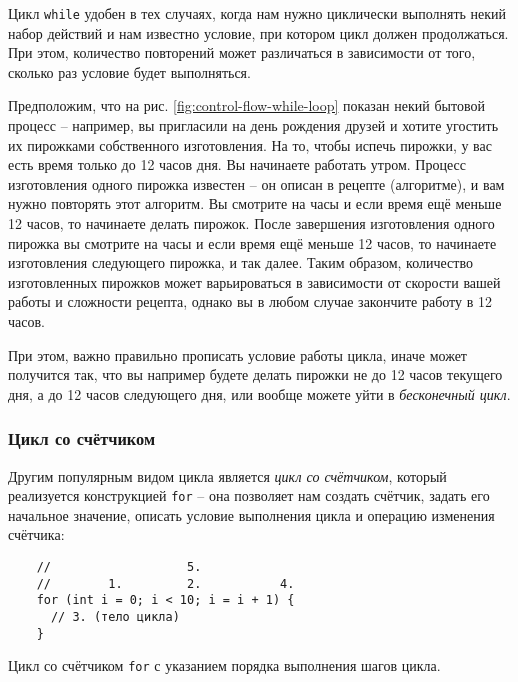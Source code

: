 \documentclass[../sparc.tex]{subfiles}
\begin{document}
Цикл \texttt{while} удобен в тех случаях, когда нам нужно циклически выполнять
некий набор действий и нам известно условие, при котором цикл должен
продолжаться.  При этом, количество повторений может различаться в зависимости
от того, сколько раз условие будет выполняться.

Предположим, что на рис. \ref{fig:control-flow-while-loop} показан некий бытовой
процесс -- например, вы пригласили на день рождения друзей и хотите угостить их
пирожками собственного изготовления.  На то, чтобы испечь пирожки, у вас есть
время только до 12 часов дня.  Вы начинаете работать утром.  Процесс
изготовления одного пирожка известен -- он описан в рецепте (алгоритме), и вам
нужно повторять этот алгоритм.  Вы смотрите на часы и если время ещё меньше 12
часов, то начинаете делать пирожок.  После завершения изготовления одного
пирожка вы смотрите на часы и если время ещё меньше 12 часов, то начинаете
изготовления следующего пирожка, и так далее.  Таким образом, количество
изготовленных пирожков может варьироваться в зависимости от скорости вашей
работы и сложности рецепта, однако вы в любом случае закончите работу в 12
часов.

При этом, важно правильно прописать условие работы цикла, иначе может получится
так, что вы например будете делать пирожки не до 12 часов текущего дня, а до 12
часов следующего дня, или вообще можете уйти в \emph{бесконечный цикл}.

\subsubsection{Цикл со счётчиком}

Другим популярным видом цикла является \emph{цикл со счётчиком}, который
реализуется конструкцией \texttt{for} -- она позволяет нам создать счётчик,
задать его начальное значение, описать условие выполнения цикла и операцию
изменения счётчика:

\begin{listing}[ht]
  \begin{verbatim}
    //                   5.
    //        1.         2.           4.
    for (int i = 0; i < 10; i = i + 1) {
      // 3. (тело цикла)
    }
  \end{verbatim}
  \label{listing:dialogues-with-computer-for}
  \caption{Цикл со счётчиком \texttt{for} с указанием порядка выполнения шагов
    цикла.}
\end{listing}
\end{document}
